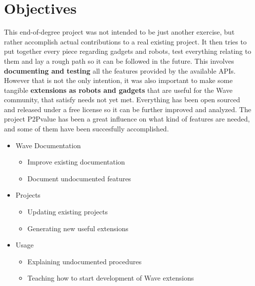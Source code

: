\section{Objectives}
This end-of-degree project was not intended to be just another exercise, but rather accomplish actual contributions to a real existing project. It then tries to put together every piece regarding gadgets and robots, test everything relating to them and lay a rough path so it can be followed in the future. This involves \textbf{documenting and testing} all the features provided by the available APIs.\\[.2cm]
However that is not the only intention, it was also important to make some tangible \textbf{extensions as robots and gadgets} that are useful for the Wave community, that satisfy needs not yet met. Everything has been open sourced and released under a free license \cite{ref:agpl} so it can be further improved and analyzed. The project P2Pvalue \cite{ref:p2pvalue} has been a great influence on what kind of features are needed, and some of them have been succesfully accomplished.
\begin{itemize}
  \item {
    Wave Documentation
    \begin{itemize}
      \item Improve existing documentation
      \item Document undocumented features
    \end{itemize}
  }
  \item {
    Projects
    \begin{itemize}
      \item Updating existing projects
      \item Generating new useful extensions
    \end{itemize}
  }
  \item {
    Usage
    \begin{itemize}
      \item Explaining undocumented procedures
      \item Teaching how to start development of Wave extensions
    \end{itemize}
  }
\end{itemize}

